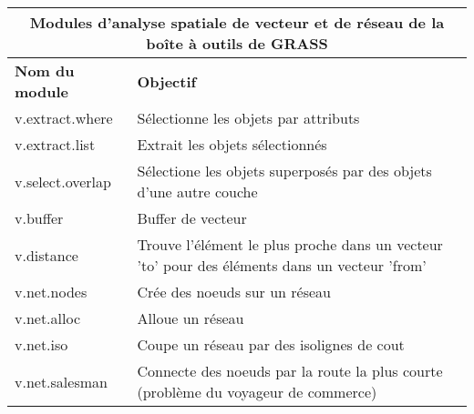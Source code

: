 \begin{table}[H]
\centering
 \begin{tabular}{|p{4cm}|p{10cm}|}
  \hline \multicolumn{2}{|c|}{\textbf{Modules d'analyse spatiale de vecteur et de réseau de la boîte à outils de GRASS}} \\
  \hline \textbf{Nom du module} & \textbf{Objectif} \\
  \hline v.extract.where & Sélectionne les objets par attributs\\
  \hline v.extract.list & Extrait les objets sélectionnés\\
  \hline v.select.overlap & Sélectione les objets superposés par des objets d'une autre couche\\
  \hline v.buffer & Buffer de vecteur\\
  \hline v.distance & Trouve l'élément le plus proche dans un vecteur 'to' pour des éléments dans un vecteur 'from'\\
  \hline v.net.nodes & Crée des noeuds sur un réseau\\
  \hline v.net.alloc & Alloue un réseau\\
  \hline v.net.iso & Coupe un réseau par des isolignes de cout\\
  \hline v.net.salesman & Connecte des noeuds par la route la plus courte (problème du voyageur de commerce) \\

\end{tabular}
\end{table}
